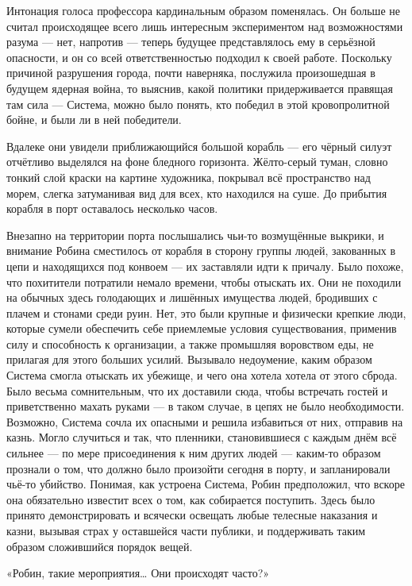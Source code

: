 \documentclass[a5paper, 9pt,
final, openany, twoside=true]{memoir}
\begin{document}
Интонация голоса профессора кардинальным образом поменялась. Он больше не считал происходящее всего лишь интересным экспериментом над возможностями разума — нет, напротив — теперь будущее представлялось ему в серьёзной опасности, и он со всей ответственностью подходил к своей работе. Поскольку причиной разрушения города, почти наверняка, послужила произошедшая в будущем ядерная война, то выяснив, какой политики придерживается правящая там сила — Система, можно было понять, кто победил в этой кровопролитной бойне, и были ли в ней победители.\bigskip

Вдалеке они увидели приближающийся большой корабль — его чёрный силуэт отчётливо выделялся на фоне бледного горизонта. Жёлто-серый туман, словно тонкий слой краски на картине художника, покрывал всё пространство над морем, слегка затуманивая вид для всех, кто находился на суше. До прибытия корабля в порт оставалось несколько часов.

Внезапно на территории порта послышались чьи-то возмущённые выкрики, и внимание Робина сместилось от корабля в сторону группы людей, закованных в цепи и находящихся под конвоем — их заставляли идти к причалу. Было похоже, что похитители потратили немало времени, чтобы отыскать их. Они не походили на обычных здесь голодающих и лишённых имущества людей, бродивших с плачем и стонами среди руин. Нет, это были крупные и физически крепкие люди, которые сумели обеспечить себе приемлемые условия существования, применив силу и способность к организации, а также промышляя воровством еды, не прилагая для этого больших усилий. Вызывало недоумение, каким образом Система смогла отыскать их убежище, и чего она хотела хотела от этого сброда. Было весьма сомнительным, что их доставили сюда, чтобы встречать гостей и приветственно махать руками — в таком случае, в цепях не было необходимости. Возможно, Система сочла их опасными и решила избавиться от них, отправив на казнь. Могло случиться и так, что пленники, становившиеся с каждым днём всё сильнее — по мере присоединения к ним других людей — каким-то образом прознали о том, что должно было произойти сегодня в порту, и запланировали чьё-то убийство. Понимая, как устроена Система, Робин предположил, что вскоре она обязательно известит всех о том, как собирается поступить. Здесь было принято демонстрировать и всячески освещать любые телесные наказания и казни, вызывая страх у оставшейся части публики, и поддерживать таким образом сложившийся порядок вещей.\bigskip

«Робин, такие мероприятия… Они происходят часто?»
\end{document}
